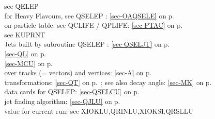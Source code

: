   see QELEP  \\
  for Heavy Flavours, see QSELEP : \ref{sec-OAQSELE} on p.~\pageref{sec-OAQSELE}\\
 on particle table: see QCLIFE / QPLIFE:
 \ref{sec-PTAC} on p.~\pageref{sec-PTAC}\\
 see KUPRNT\\
  Jets built by subroutine QSELEP : \ref{sec-QSELJT} on p.~\pageref{sec-QSELJT}\\
 \ref{sec-QL} on p.~\pageref{sec-QL}\\
 \ref{sec-MCU} on p.~\pageref{sec-MCU}\\
 over tracks (= vectors) and vertices:
 \ref{sec-A} on p.~\pageref{sec-A}\\
 transformations: \ref{sec-QT} on p.~\pageref{sec-QT};
 see also decay angle: \ref{sec-MK} on p.~\pageref{sec-MK}\\
 data cards for QSELEP: \ref{sec-QSELCU} on p.~\pageref{sec-QSELCU}\\
 jet finding algorithm: \ref{sec-QJLU} on p.~\pageref{sec-QJLU}\\
 value for current run: see XIOKLU,QRINLU,XIOKSI,QRSLLU
 
